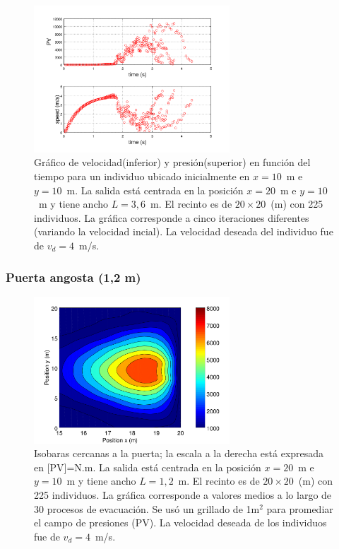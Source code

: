 \begin{figure}[H]
    \centering
    \includegraphics[height=5.5cm]{figuras/pv_vel_t_100_3_6.png}
    \caption[width=5cm]{Gráfico de velocidad(inferior) y presión(superior) en función del tiempo para un individuo ubicado inicialmente en $x=10$~m e $y=10$~m.  La salida está centrada en la posición $x=20$~m e $y=10$~m y tiene ancho $L=3,6$~m. El recinto es de $20\times 20$~(m) con 225 individuos. La gráfica corresponde a cinco iteraciones diferentes (variando la velocidad incial). La velocidad deseada del individuo fue de $v_d=4$~m/s.}
    \label{sintesis}
\end{figure}

\subsubsection{Puerta angosta (1,2 m)}

\begin{figure}[H]
    \centering
    \includegraphics[height=5.5cm]{figuras/press_225p_v4_onedoor_1_2.png}
    \caption[width=5cm]{Isobaras cercanas a la puerta; la escala a la derecha está expresada en [PV]=N.m. La salida está centrada en la posición $x=20$~m e $y=10$~m y tiene ancho $L=1,2$~m. El recinto es de $20\times 20$~(m) con 225 individuos. La gráfica corresponde a valores medios a lo largo de 30 procesos de evacuación. Se usó un grillado de 1m$^2$ para promediar el campo de presiones (PV). La velocidad deseada de los individuos fue de $v_d=4$~m/s.}
    \label{isobaras_1_2m}
\end{figure}

